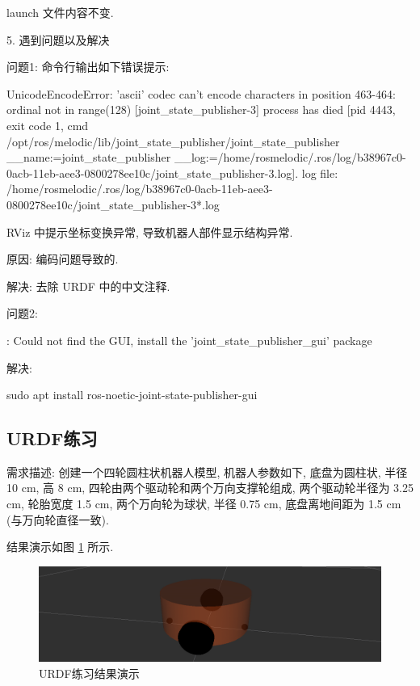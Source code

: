 \documentclass[openany, fontset=windowsold]{ctexbook}
\theoremstyle{kaiti}
\theoremstyle{normal}
\begin{document}
launch 文件内容不变.

5. 遇到问题以及解决

问题1: 命令行输出如下错误提示:

\begin{bash}
  UnicodeEncodeError: 'ascii' codec can't encode characters in position 463-464: ordinal not in range(128)
  [joint_state_publisher-3] process has died [pid 4443, exit code 1, cmd /opt/ros/melodic/lib/joint_state_publisher/joint_state_publisher __name:=joint_state_publisher __log:=/home/rosmelodic/.ros/log/b38967c0-0acb-11eb-aee3-0800278ee10c/joint_state_publisher-3.log].
  log file: /home/rosmelodic/.ros/log/b38967c0-0acb-11eb-aee3-0800278ee10c/joint_state_publisher-3*.log
\end{bash}

RViz 中提示坐标变换异常, 导致机器人部件显示结构异常.

原因: 编码问题导致的.

解决: 去除 URDF 中的中文注释.

问题2: 

\begin{bash}
  [ERROR] [1584370263.037038]: Could not find the GUI, install the 'joint_state_publisher_gui' package
\end{bash}

解决:

\begin{bash}
  sudo apt install ros-noetic-joint-state-publisher-gui
\end{bash}

\subsection{URDF练习}

需求描述: 创建一个四轮圆柱状机器人模型, 机器人参数如下, 底盘为圆柱状, 半径 10 cm, 高 8 cm, 四轮由两个驱动轮和两个万向支撑轮组成, 两个驱动轮半径为 3.25 cm, 轮胎宽度 1.5 cm, 两个万向轮为球状, 半径 0.75 cm, 底盘离地间距为 1.5 cm (与万向轮直径一致).

结果演示如图 \ref{fig:urdf_test} 所示.

\begin{figure}[!ht]
  \centering
  \includegraphics[width=.9\textwidth]{urdf_test.png}
  \caption{URDF练习结果演示}
  \label{fig:urdf_test}
\end{figure}
\end{document}
